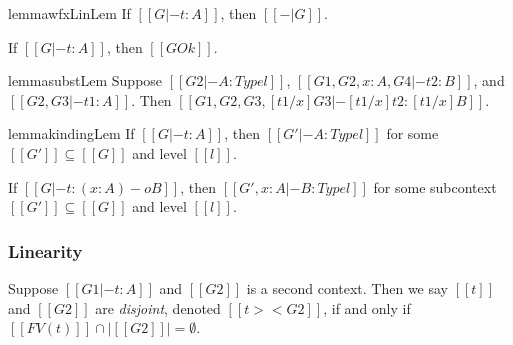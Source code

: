 \begin{restatable}{lemma}{wfxLinLem}
  \label{lemma:well-formed_context_linearity}
  If $[[G |- t : A]]$, then $[[-| G]]$.
\end{restatable}

\begin{corollary}
  \label{corollary:well-formed_contexts}
  If $[[G |- t : A]]$, then $[[G Ok]]$.
\end{corollary}

\begin{restatable}{lemma}{substLem}
  \label{lemma:substitution_for_typing}  
  Suppose
  $[[G2 |- A : Type l]]$,
  $[[G1,G2,x : A,G4 |- t2 : B]]$, and
  $[[G2,G3 |- t1 : A]]$.  Then
  $[[G1,G2,G3,[t1/x]G3 |- [t1/x]t2 : [t1/x]B]]$.
\end{restatable}

\begin{restatable}{lemma}{kindingLem}
  \label{lemma:kinding_for_typing}
If $[[G |- t : A]]$, then $[[G' |- A : Type l]]$ for some $[[G']] \subseteq [[G]]$ and level $[[l]]$.
\end{restatable}

\begin{lemma}
  \label{lemma:arrow_kinding}
  If $[[G |- t : (x : A) -o B]]$, then $[[G', x : A |- B : Type l]]$
  for some subcontext $[[G']] \subseteq [[G]]$ and level $[[l]]$.
\end{lemma}


\subsubsection{Linearity}
\label{subsec:linearity}
\begin{definition}
  \label{def:disjointness}
  Suppose $[[G1 |- t : A]]$ and $[[G2]]$ is a second context.  Then we
  say $[[t]]$ and $[[G2]]$ are \emph{disjoint}, denoted $[[t >< G2]]$,
  if and only if $[[FV(t)]] \cap |[[G2]]| = \emptyset$.
\end{definition}


